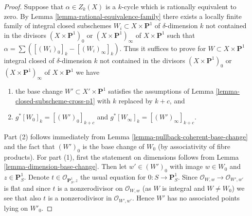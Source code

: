 \documentclass[10pt,a4paper]{amsart}
\theoremstyle{plain}
\theoremstyle{definition}
\theoremstyle{remark}
\numberwithin{equation}{subsection}
\begin{document}
\begin{proof}
Suppose that $\alpha \in Z_k(X)$ is a $k$-cycle which is rationally equivalent
to zero. By Lemma \ref{lemma-rational-equivalence-family}
there exists a locally finite family of integral closed subschemes
$W_i \subset X \times \mathbf{P}^1$ of $\delta$-dimension $k$
not contained in the divisors
$(X \times \mathbf{P}^1)_0$ or $(X \times \mathbf{P}^1)_\infty$
of $X \times \mathbf{P}^1$ such that
$\alpha = \sum ([(W_i)_0]_k - [(W_i)_\infty]_k)$.
Thus it suffices to prove for $W \subset X \times \mathbf{P}^1$
integral closed of $\delta$-dimension $k$ not contained in the divisors
$(X \times \mathbf{P}^1)_0$ or $(X \times \mathbf{P}^1)_\infty$
of $X \times \mathbf{P}^1$ we have
\begin{enumerate}
\item the base change $W' \subset X' \times \mathbf{P}^1$ satisfies the
assumptions of Lemma \ref{lemma-closed-subscheme-cross-p1} with
$k$ replaced by $k + c$, and
\item $g^*[W_0]_k = [(W')_0]_{k + c}$ and
$g^*[W_\infty]_k = [(W')_\infty]_{k + c}$.
\end{enumerate}
Part (2) follows immediately from
Lemma \ref{lemma-pullback-coherent-base-change} and the fact that
$(W')_0$ is the base change of $W_0$ (by associativity of fibre products).
For part (1), first the statement on dimensions follows
from Lemma \ref{lemma-dimension-base-change}.
Then let $w' \in (W')_0$ with image $w \in W_0$
and $z \in \mathbf{P}^1_S$. Denote $t \in \mathcal{O}_{\mathbf{P}^1_S, z}$
the usual equation for $0 : S \to \mathbf{P}^1_S$.
Since $\mathcal{O}_{W, w} \to \mathcal{O}_{W', w'}$ is flat
and since $t$ is a nonzerodivisor on $\mathcal{O}_{W, w}$
(as $W$ is integral and $W \not = W_0$) we see that also
$t$ is a nonzerodivisor in $\mathcal{O}_{W', w'}$. Hence
$W'$ has no associated points lying on $W'_0$.
\end{proof}
\end{document}
